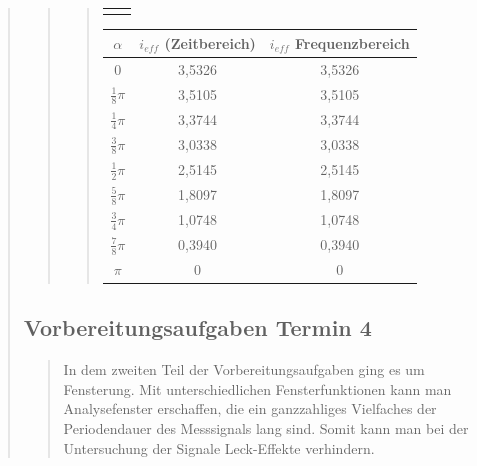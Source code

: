 \begin{quote}
\begin{quote}
\begin{quote}
\begin{center}
\begin{tabular}{ll}
\begin{minipage}{0.6\textwidth}
                    \end{minipage}
    
                \end{tabular}
                \end{center}
                 \begin{center}
                     \begin{tabular}{|c|c|c|}
                                 
                       \hline
                       $\alpha $ & $i_{eff}$ (Zeitbereich) & $i_{eff}$ Frequenzbereich\\ \hline
                       $0$ & 3,5326 & 3,5326 \\ \hline
                       $\frac{1}{8} \pi$ & 3,5105 & 3,5105 \\ \hline
                       $\frac{1}{4} \pi$ & 3,3744 & 3,3744 \\ \hline
                       $\frac{3}{8} \pi$ & 3,0338 & 3,0338 \\ \hline
                       $\frac{1}{2} \pi$ & 2,5145 & 2,5145 \\ \hline
                       $\frac{5}{8} \pi$ & 1,8097 & 1,8097 \\ \hline
                       $\frac{3}{4} \pi$ & 1,0748 & 1,0748 \\ \hline
                       $\frac{7}{8} \pi$ & 0,3940 & 0,3940 \\ \hline
                       $ \pi$ & 0 & 0 \\ \hline
                             
               
                     \end{tabular}
                 \end{center}        
        \end{quote}
    \end{quote}
    \subsection{Vorbereitungsaufgaben Termin 4}
    \begin{quote}
        In dem zweiten Teil der Vorbereitungsaufgaben ging es um Fensterung. Mit
        unterschiedlichen Fensterfunktionen kann man Analysefenster erschaffen,
        die ein ganzzahliges Vielfaches der Periodendauer des Messsignals lang
        sind. Somit kann man bei der Untersuchung der Signale Leck-Effekte
        verhindern.\\
        

\end{quote}
\end{quote}
